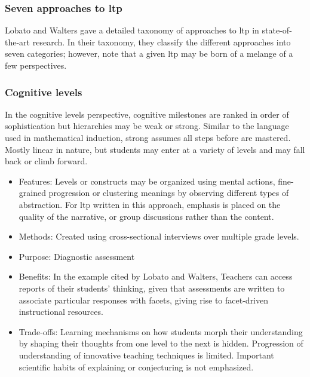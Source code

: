 \documentclass{TC}
\begin{document}
\subsubsection{Seven approaches to \gls{ltp}}
Lobato and Walters \parencite{lobato_taxonomy_2017} gave a detailed taxonomy of approaches to \gls{ltp} in state-of-the-art research. In their taxonomy, they classify the different approaches into seven categories; however, note that a given \gls{ltp} may be born of a melange of a few perspectives.

\subsubsection{Cognitive levels}

In the cognitive levels perspective, cognitive milestones are ranked in order of sophistication but hierarchies may be weak or strong. Similar to the language used in mathematical induction, strong assumes all steps before are mastered. Mostly linear in nature, but students may enter at a variety of levels and may fall back or climb forward. 
\begin{multicols}{2}
\begin{itemize}
\item Features: Levels or constructs may be organized using mental actions, fine-grained progression or clustering meanings by observing different types of abstraction. For \gls{ltp} written in this approach, emphasis is placed on the quality of the narrative, or group discussions rather than the content.

\item Methods: Created using cross-sectional interviews over multiple grade levels. 

\item Purpose: Diagnostic assessment

\item Benefits: In the example cited by Lobato and Walters, Teachers can access reports of their students' thinking, given that assessments are written to associate particular responses with facets, giving rise to facet-driven instructional resources.

\item Trade-offs: Learning mechanisms on how students morph their understanding by shaping their thoughts from one level to the next is hidden. Progression of understanding of innovative teaching techniques is limited. Important scientific habits of explaining or conjecturing is not emphasized. 
 \end{itemize}
 \end{multicols}
 
\end{document}
